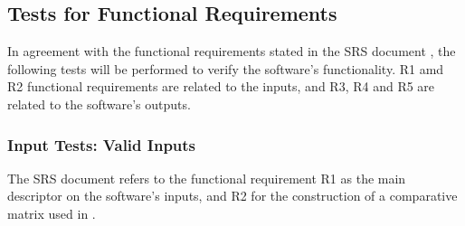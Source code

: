 \documentclass[12pt, titlepage]{article}
\begin{document}

\subsection{Tests for Functional Requirements}\label{func-req}

In agreement with the functional requirements stated in the SRS document \citet{SRS},
the following tests will be performed to verify the software's functionality. R1 amd R2 
functional requirements are related to the \progname{} inputs, and R3, R4 and R5 are 
related to the software's outputs.




\subsubsection{Input Tests: Valid Inputs}

The SRS document \citet{SRS} refers to the functional requirement R1 as the main 
descriptor on the software's inputs, and R2 for the construction of a comparative matrix 
used in \citet{NEEDLEMAN1970443}.
		
\end{document}
